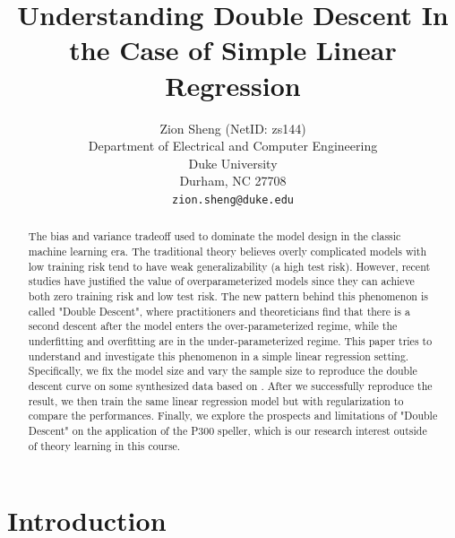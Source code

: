 \documentclass{article}
\title{Understanding Double Descent In the Case of Simple Linear Regression}
\author{
	Zion Sheng (NetID: zs144)\\
	Department of Electrical and Computer Engineering\\
	Duke University\\
	Durham, NC 27708 \\
	\texttt{zion.sheng@duke.edu} \\
}
\date{} %
\begin{document}
\maketitle

\begin{abstract}
	The bias and variance tradeoff used to dominate the model design in the classic machine learning era. The traditional theory believes overly complicated models with low training risk tend to have weak generalizability (a high test risk). However, recent studies have justified the value of overparameterized models since they can achieve both zero training risk and low test risk. The new pattern behind this phenomenon is called "Double Descent", where practitioners and theoreticians find that there is a second descent after the model enters the over-parameterized regime, while the underfitting and overfitting are in the under-parameterized regime. This paper tries to understand and investigate this phenomenon in a simple linear regression setting. Specifically, we fix the model size and vary the sample size to reproduce the double descent curve on some synthesized data based on \cite{nakkiran2019more}. After we successfully reproduce the result, we then train the same linear regression model but with regularization to compare the performances. Finally, we explore the prospects and limitations of "Double Descent" on the application of the P300 speller, which is our research interest outside of theory learning in this course.
\end{abstract}




\section{Introduction}
\end{document}
